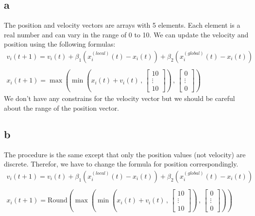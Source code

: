 \documentclass[]{article}
\newcommand{\mat}[1]{\begin{bmatrix} #1 \end{bmatrix}}
\begin{document}
	\subsection*{a}
	The position and velocity vectors are arrays with 5 elements. Each element is a real number and can vary in the range of 0 to 10. We can update the velocity and position using the following formulas:
	\begin{align*}
		v_i(t+1) = v_i(t) + \beta_1 \left(x_i^{(local)} (t) - x_i(t)\right) + \beta_2 \left(x_i^{(global)} (t) - x_i(t)\right) \\\\
		x_i(t+1) = \max\left(\min\left(x_i(t) + v_i(t) \, , \, \mat{10 \\ \vdots \\ 10}\right) \, , \, \mat{0 \\ \vdots \\ 0}\right)
	\end{align*}
	We don't have any constrains for the velocity vector but we should be careful about the range of the position vector.
	
	\subsection*{b}
	The procedure is the same except that only the position values (not velocity) are discrete. Therefor, we have to change the formula for position correspondingly.
	\begin{align*}
		v_i(t+1) = v_i(t) + \beta_1 \left(x_i^{(local)} (t) - x_i(t)\right) + \beta_2 \left(x_i^{(global)} (t) - x_i(t)\right) \\\\
		x_i(t+1) = \text{Round}\left(\max\left(\min\left(x_i(t) + v_i(t) \, , \, \mat{10 \\ \vdots \\ 10}\right) \, , \, \mat{0 \\ \vdots \\ 0}\right)\right)
	\end{align*}

\end{document}
